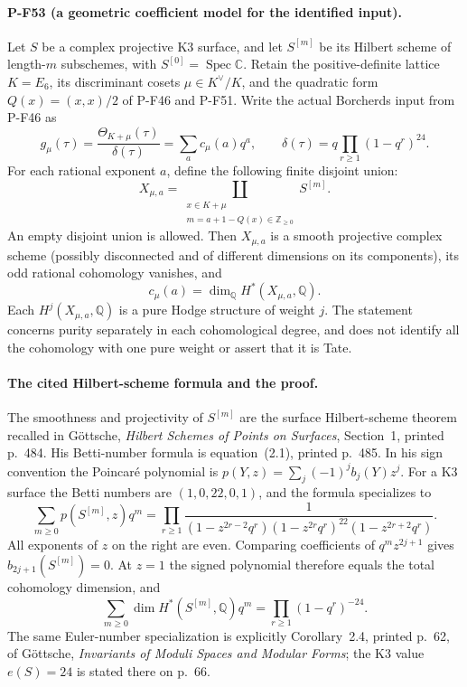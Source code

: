 \documentclass[11pt,a4paper]{article}
\begin{document}
\paragraph{P-F53 (a geometric coefficient model for the identified input).}
Let $S$ be a complex projective K3 surface, and let $S^{[m]}$
be its Hilbert scheme of length-$m$ subschemes, with
$S^{[0]}=\operatorname{Spec}\mathbb C$.
Retain the positive-definite lattice $K=E_6$, its discriminant
cosets $\mu\in K^\vee/K$, and the quadratic form
$Q(x)=(x,x)/2$ of P-F46 and P-F51. Write the actual
Borcherds input from P-F46 as
\[
 g_\mu(\tau)=\frac{\Theta_{K+\mu}(\tau)}{\delta(\tau)}
        =\sum_a c_\mu(a)q^a,
 \qquad \delta(\tau)=q\prod_{r\ge1}(1-q^r)^{24}.
                                                        \tag{P-F53a}
\]
For each rational exponent $a$, define the following finite disjoint union:
\[
 X_{\mu,a}=
 \coprod_{\substack{x\in K+\mu\\
                  m=a+1-Q(x)\in\mathbb Z_{\ge0}}} S^{[m]}.
                                                        \tag{P-F53b}
\]
An empty disjoint union is allowed. Then $X_{\mu,a}$ is a
smooth projective complex scheme (possibly disconnected and
of different dimensions on its components), its odd rational
cohomology vanishes, and
\[
          c_\mu(a)=\dim_{\mathbb Q}H^*(X_{\mu,a},\mathbb Q).
                                                        \tag{P-F53c}
\]
Each $H^j(X_{\mu,a},\mathbb Q)$ is a pure Hodge structure of
weight $j$. The statement concerns purity separately in each
cohomological degree, and does not identify all the cohomology
with one pure weight or assert that it is Tate.

\paragraph{The cited Hilbert-scheme formula and the proof.}
The smoothness and projectivity of $S^{[m]}$ are the
surface Hilbert-scheme theorem recalled in G\"ottsche,
\emph{Hilbert Schemes of Points on Surfaces}, Section~1,
printed p.~484. His Betti-number formula is equation~(2.1),
printed p.~485. In his sign convention the Poincar\'e
polynomial is $p(Y,z)=\sum_j(-1)^jb_j(Y)z^j$.
For a K3 surface the Betti numbers are $(1,0,22,0,1)$,
and the formula specializes to
\[
 \sum_{m\ge0}p(S^{[m]},z)q^m
 =\prod_{r\ge1}
   \frac1{(1-z^{2r-2}q^r)
           (1-z^{2r}q^r)^{22}
           (1-z^{2r+2}q^r)}.
                                                        \tag{P-F53d}
\]
All exponents of $z$ on the right are even. Comparing
coefficients of $q^m z^{2j+1}$ gives
$b_{2j+1}(S^{[m]})=0$.
At $z=1$ the signed polynomial therefore equals the
total cohomology dimension, and
\[
 \sum_{m\ge0}\dim H^*(S^{[m]},\mathbb Q)q^m
                   =\prod_{r\ge1}(1-q^r)^{-24}.
                                                        \tag{P-F53e}
\]
The same Euler-number specialization is explicitly
Corollary~2.4, printed p.~62, of G\"ottsche,
\emph{Invariants of Moduli Spaces and Modular Forms};
the K3 value $e(S)=24$ is stated there on p.~66.
\end{document}
